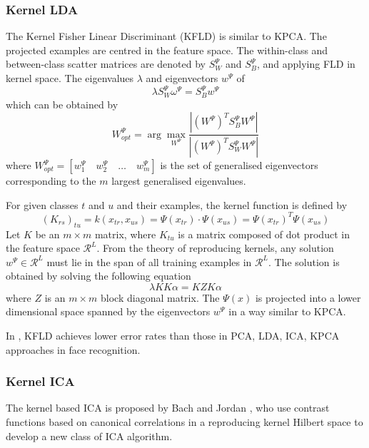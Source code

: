 \subsubsection{Kernel LDA}
The Kernel Fisher Linear Discriminant (KFLD) \cite{Yang2002} is similar to KPCA. The projected examples are centred in the feature space. The within-class and between-class scatter matrices are denoted by $S_W^{\Psi}$ and $S_B^{\Psi}$, and applying FLD in kernel space. The eigenvalues $\lambda$ and eigenvectors $w^{\Psi}$ of
\begin{equation}
 \lambda S_W^{\Psi} \omega^{\Psi} = S_B^{\Psi} w^{\Psi}
\end{equation}
which can be obtained by
\begin{equation}
 W_{opt}^{\Psi} = \arg \max_{W^{\Psi}} \frac{|(W^{\Psi})^T S_B^{\Psi} W^{\Psi}|}    {|(W^{\Psi})^T S_W^{\Psi} W^{\Psi}|}  
\end{equation}
where $W_{opt}^{\Psi} =[w_1^{\Psi}\quad w_2^{\Psi}\quad \ldots \quad w_m^{\Psi}]$ is the set of generalised eigenvectors corresponding to the $m$ largest generalised eigenvalues.

For given classes $t$ and $u$ and their examples, the kernel function is defined by
\begin{equation}
 (K_{rs})_{tu} = k(x_{tr}, x_{us}) = \Psi(x_{tr})\cdot \Psi(x_{us}) = \Psi(x_{tr})^T \Psi(x_{us})
\end{equation}
Let $K$ be an $m\times m$ matrix, where $K_{tu}$ is a matrix composed of dot product in the feature space $\mathcal{R}^L$.
From the theory of reproducing kernels, any solution $w^{\Psi} \in \mathcal{R}^L$ must lie in the span of all training examples in $\mathcal{R}^L$. The solution is obtained by solving the following equation 
\begin{equation}
 \lambda K K \alpha = K Z K \alpha
\end{equation}
where $Z$ is an $m\times m$ block diagonal matrix.
The $\Psi(x)$ is projected into a lower dimensional space spanned by the eigenvectors $w^{\Psi}$ in a way similar to KPCA. 

In \cite{Yang2002}, KFLD achieves lower error rates than those in PCA, LDA, ICA, KPCA approaches in face recognition.

\subsubsection{Kernel ICA}
The kernel based ICA is proposed by Bach and Jordan \cite{Bach2002}, who use contrast functions based on canonical correlations in a reproducing kernel Hilbert space to develop a new class of ICA algorithm.

